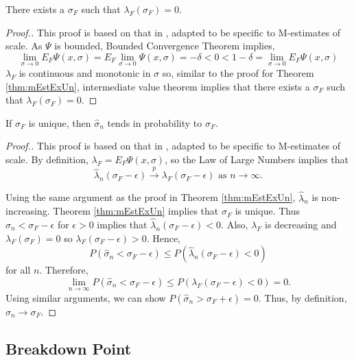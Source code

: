 \begin{thm}
\label{thm:mScaleLemma}
There exists a $\sigma_F$ such that $\lambda_F(\sigma_F) = 0$.
\end{thm} 
\begin{proof}[Proof.]
This proof is based on that in \cite{maronna2019robust}, adapted to be specific to M-estimates of scale. As $\Psi$ is bounded, Bounded Convergence Theorem implies,
$$ \lim_{\sigma\xrightarrow{} 0} E_F \Psi(x,\sigma) = E_F \lim_{\sigma\xrightarrow{} 0} \Psi(x,\sigma)  = -\delta < 0 < 1-\delta =  \lim_{\sigma\xrightarrow{} 0} E_F \Psi(x,\sigma)$$
 $\lambda_F$ is continuous and monotonic in $\sigma$ so, similar to the proof for Theorem \ref{thm:mEstExUn}, intermediate value theorem implies that there exists a $\sigma_F$ such that $\lambda_F(\sigma_F) = 0$.
\end{proof}

\begin{thm}
\label{thm:mScaleConsist} 
If $\sigma_F$ is unique, then $\hat\sigma_n$ tends in probability to $\sigma_F$.
\end{thm}
\begin{proof}[Proof.]
This proof is based on that in \cite{maronna2019robust}, adapted to be specific to M-estimates of scale. By definition, $\lambda_F = E_F \Psi(x,\sigma)$, so the Law of Large Numbers implies that
$$ \hat\lambda_n(\sigma_F - \epsilon) \xrightarrow{p} \lambda_F(\sigma_F - \epsilon) \text{ as } n \xrightarrow{} \infty.$$

Using the same argument as the proof in Theorem \ref{thm:mEstExUn}, $\hat\lambda_n$ is non-increasing. Theorem \ref{thm:mEstExUn} implies that $\sigma_F$ is unique. Thus $\hat\sigma_n < \sigma_F - \epsilon$ for $\epsilon > 0$ implies that $\hat\lambda_n(\sigma_F - \epsilon) < 0$.
Also, $\lambda_F$ is decreasing and $\lambda_F(\sigma_F) = 0$ so $\lambda_F(\sigma_F - \epsilon) > 0$. Hence,
$$ P(\hat\sigma_n < \sigma_F - \epsilon) \leq P(\hat\lambda_n(\sigma_F - \epsilon) < 0)$$
for all $n$. Therefore,
$$\lim_{n\xrightarrow{} \infty} P(\hat\sigma_n < \sigma_F - \epsilon)  \leq P(\lambda_F(\sigma_F - \epsilon) < 0) = 0.$$
Using similar arguments, we can show $P(\hat\sigma_n > \sigma_F + \epsilon) = 0$. Thus, by definition, $\hat\sigma_n \xrightarrow{} \sigma_F$.
\end{proof}

\subsection{Breakdown Point}

